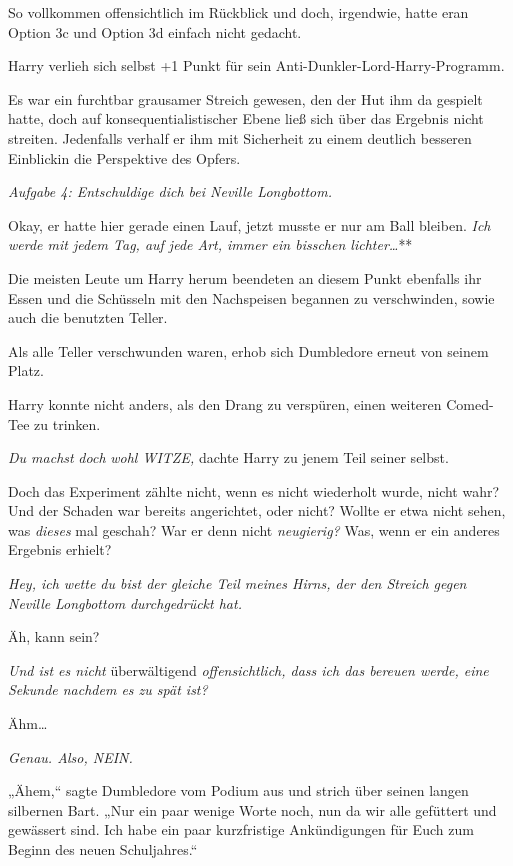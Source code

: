 {So vollkommen offensichtlich im Rückblick und doch, irgendwie, hatte eran Option 3c und Option 3d einfach nicht gedacht.

Harry verlieh sich selbst +1 Punkt für sein Anti-Dunkler-Lord-Harry-Programm.

Es war ein furchtbar grausamer Streich gewesen, den der Hut ihm da gespielt hatte, doch auf konsequentialistischer Ebene ließ sich über das Ergebnis nicht streiten. Jedenfalls verhalf er ihm mit Sicherheit zu einem deutlich besseren Einblickin die Perspektive des Opfers.

\emph{Aufgabe 4: Entschuldige dich bei Neville Longbottom.}

Okay, er hatte hier gerade einen Lauf, jetzt musste er nur am Ball bleiben. \emph{Ich werde mit jedem Tag, auf jede Art, immer ein bisschen lichter…}**

Die meisten Leute um Harry herum beendeten an diesem Punkt ebenfalls ihr Essen und die Schüsseln mit den Nachspeisen begannen zu verschwinden, sowie auch die benutzten Teller.

Als alle Teller verschwunden waren, erhob sich Dumbledore erneut von seinem Platz.

Harry konnte nicht anders, als den Drang zu verspüren, einen weiteren Comed-Tee zu trinken.

\emph{Du machst} \emph{doch} \emph{wohl WITZE,} dachte Harry zu jenem Teil seiner selbst.

Doch das Experiment zählte nicht, wenn es nicht wiederholt wurde, nicht wahr? Und der Schaden war bereits angerichtet, oder nicht? Wollte er etwa nicht sehen, was \emph{dieses} mal geschah? War er denn nicht \emph{neugierig?} Was, wenn er ein anderes Ergebnis erhielt?

\emph{Hey, ich wette du bist der gleiche Teil meines Hirns, der den Streich gegen Neville} \emph{Longbottom} \emph{durchgedrückt hat.}

Äh, kann sein?

\emph{Und ist es nicht} überwältigend \emph{offensichtlich, dass ich das bereuen werde, eine Sekunde nachdem es zu spät ist?}

Ähm…

\emph{Genau. Also, NEIN.}

„Ähem,“ sagte Dumbledore vom Podium aus und strich über seinen langen silbernen Bart. „Nur ein paar wenige Worte noch, nun da wir alle gefüttert und gewässert sind. Ich habe ein paar kurzfristige Ankündigungen für Euch zum Beginn des neuen Schuljahres.“

}
